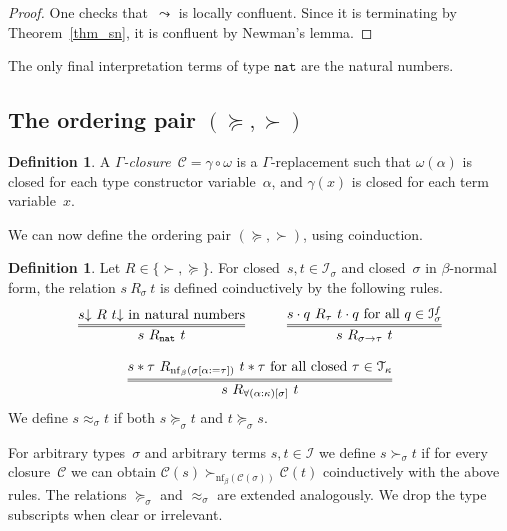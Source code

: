 \documentclass[a4paper,UKenglish,cleveref,autoref,numberwithinsect]{lipics-v2019}
\theoremstyle{definition}
\newtheorem{defn}[theorem]{Definition}
\newcommand{\Iterms}{\mathcal{I}}
\newcommand{\arrtype}{\rightarrow}
\newcommand{\app}[2]{#1 \cdot #2}
\newcommand{\tapp}[2]{#1 * #2}
\newcommand{\subst}[2]{#1:=#2}
\newcommand{\arrW}{\leadsto}
\newcommand{\nat}{\mathtt{nat}}
\newcommand{\Tc}{\mathcal{T}}
\newcommand{\cl}{\mathcal{C}}
\newcommand{\nf}{\mathrm{nf}}
\newcommand{\da}{\mathord{\downarrow}}
\begin{document}
\begin{proof}
  One checks that~$\arrW$ is locally confluent. Since it is
  terminating by Theorem~\ref{thm_sn}, it is confluent by Newman's
  lemma.
\end{proof}

\begin{lemma}\label{lem_final_nat}
  The only final interpretation terms of type $\nat$ are the natural
  numbers.
\end{lemma}

\subsection{The ordering pair $(\succeq,\succ)$}

\begin{defn}\label{def_closure}
  A \emph{$\Gamma$-closure}~$\cl = \gamma \circ \omega$ is a
  $\Gamma$-replacement such that $\omega(\alpha)$ is closed for each
  type constructor variable~$\alpha$, and $\gamma(x)$ is closed for
  each term variable~$x$.
\end{defn}

We can now define the ordering pair $(\succeq,\succ)$, using
coinduction.

\begin{defn}\label{def:succ}
  Let $R \in \{ \succ,\succeq \}$. For closed~$s,t\in\Iterms_\sigma$
  and closed~$\sigma$ in $\beta$-normal form, the relation
  $s\ R_{\sigma}\ t$ is defined coinductively by the following rules.
  \[
  \begin{array}{cc}
    \infer={s\ R_\nat\ t}{s\da\ R\ t\da \text{ in natural numbers}} \quad&\quad
    \infer={s\ R_{\sigma\arrtype\tau}\ t}{\app{s}{q}\ R_{\tau}\ \app{t}{q} \text{ for all } q \in \Iterms^f_\sigma} \\ \\
    \multicolumn{2}{c}{
    \infer={s\ R_{\forall(\alpha:\kappa)[\sigma]}\ t}{\tapp{s}{\tau}\ R_{\nf_\beta(\sigma[\subst{\alpha}{\tau}])}\ \tapp{t}{\tau} \text{ for all closed } \tau \in \Tc_{\kappa}}}
  \end{array}
  \]
  We define $s \approx_\sigma t$ if both $s \succeq_\sigma t$ and $t
  \succeq_\sigma s$.

  For arbitrary types~$\sigma$ and arbitrary terms $s,t \in \Iterms$
  we define $s \succ_\sigma t$ if for every closure~$\cl$ we can
  obtain $\cl(s) \succ_{\nf_\beta(\cl(\sigma))} \cl(t)$ coinductively
  with the above rules. The relations $\succeq_\sigma$ and
  $\approx_\sigma$ are extended analogously. We drop the type
  subscripts when clear or irrelevant.
\end{defn}
\end{document}
